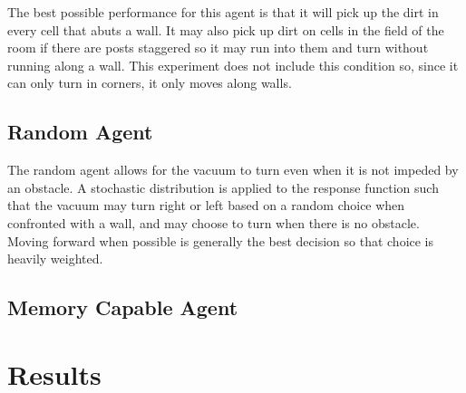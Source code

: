 \documentclass[12pt]{article}
\begin{document}
The best possible performance for this agent is that it will pick up the dirt in every cell that abuts a wall.
It may also pick up dirt on cells in the field of the room if there are posts staggered so it may run into them and turn without running along a wall.
This experiment does not include this condition so, since it can only turn in corners, it only moves along walls.

\subsection{Random Agent}

The random agent allows for the vacuum to turn even when it is not impeded by an obstacle.
A stochastic distribution is applied to the response function such that the vacuum may turn right or left based on a random choice when confronted with a wall, and may choose to turn when there is no obstacle.
Moving forward when possible is generally the best decision so that choice is heavily weighted.

\subsection{Memory Capable Agent}

\section{Results}
\end{document}
